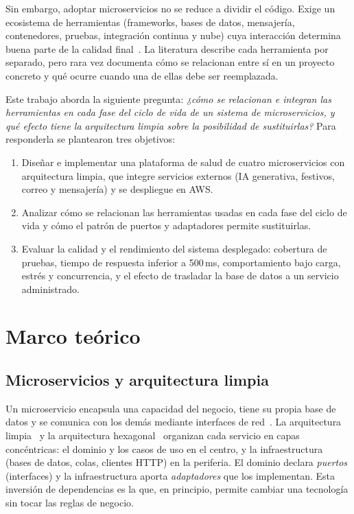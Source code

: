 \documentclass[conference]{IEEEtran}
\begin{document}
Sin embargo, adoptar microservicios no se reduce a dividir el código. Exige un ecosistema de herramientas (frameworks, bases de datos, mensajería, contenedores, pruebas, integración continua y nube) cuya interacción determina buena parte de la calidad final~\cite{dragoni2017}. La literatura describe cada herramienta por separado, pero rara vez documenta cómo se relacionan entre sí en un proyecto concreto y qué ocurre cuando una de ellas debe ser reemplazada.

Este trabajo aborda la siguiente pregunta: \emph{¿cómo se relacionan e integran las herramientas en cada fase del ciclo de vida de un sistema de microservicios, y qué efecto tiene la arquitectura limpia sobre la posibilidad de sustituirlas?} Para responderla se plantearon tres objetivos:
\begin{enumerate}
\item Diseñar e implementar una plataforma de salud de cuatro microservicios con arquitectura limpia, que integre servicios externos (IA generativa, festivos, correo y mensajería) y se despliegue en AWS.
\item Analizar cómo se relacionan las herramientas usadas en cada fase del ciclo de vida y cómo el patrón de puertos y adaptadores permite sustituirlas.
\item Evaluar la calidad y el rendimiento del sistema desplegado: cobertura de pruebas, tiempo de respuesta inferior a 500\,ms, comportamiento bajo carga, estrés y concurrencia, y el efecto de trasladar la base de datos a un servicio administrado.
\end{enumerate}

\section{Marco teórico}
\subsection{Microservicios y arquitectura limpia}
Un microservicio encapsula una capacidad del negocio, tiene su propia base de datos y se comunica con los demás mediante interfaces de red~\cite{lewis2014,richardson2018}. La arquitectura limpia~\cite{martin2017} y la arquitectura hexagonal~\cite{cockburn2005} organizan cada servicio en capas concéntricas: el dominio y los casos de uso en el centro, y la infraestructura (bases de datos, colas, clientes HTTP) en la periferia. El dominio declara \emph{puertos} (interfaces) y la infraestructura aporta \emph{adaptadores} que los implementan. Esta inversión de dependencias es la que, en principio, permite cambiar una tecnología sin tocar las reglas de negocio.
\end{document}
